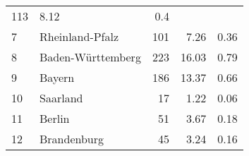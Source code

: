 \begin{longtable}{lXrrr}
       \num{113} &
       \num[round-mode=places,round-precision=2]{8,12} &
         \num[round-mode=places,round-precision=2]{0,4} \\

     7 &
     \multicolumn{1}{X}{ Rheinland-Pfalz   } &


       \num{101} &
       \num[round-mode=places,round-precision=2]{7,26} &
         \num[round-mode=places,round-precision=2]{0,36} \\

     8 &
     \multicolumn{1}{X}{ Baden-Württemberg   } &


       \num{223} &
       \num[round-mode=places,round-precision=2]{16,03} &
         \num[round-mode=places,round-precision=2]{0,79} \\

     9 &
     \multicolumn{1}{X}{ Bayern   } &


       \num{186} &
       \num[round-mode=places,round-precision=2]{13,37} &
         \num[round-mode=places,round-precision=2]{0,66} \\

     10 &
     \multicolumn{1}{X}{ Saarland   } &


       \num{17} &
       \num[round-mode=places,round-precision=2]{1,22} &
         \num[round-mode=places,round-precision=2]{0,06} \\

     11 &
     \multicolumn{1}{X}{ Berlin   } &


       \num{51} &
       \num[round-mode=places,round-precision=2]{3,67} &
         \num[round-mode=places,round-precision=2]{0,18} \\

     12 &
     \multicolumn{1}{X}{ Brandenburg   } &


       \num{45} &
       \num[round-mode=places,round-precision=2]{3,24} &
         \num[round-mode=places,round-precision=2]{0,16} \\


\end{longtable}
